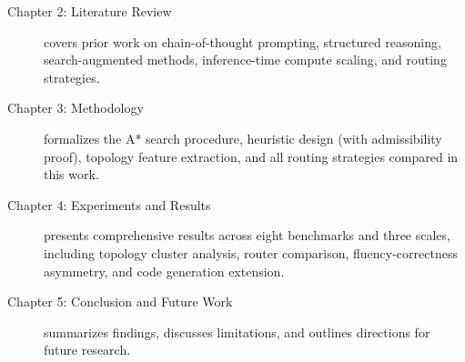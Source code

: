 \begin{description}
\item[Chapter 2: Literature Review] covers prior work on chain-of-thought prompting, structured reasoning, search-augmented methods, inference-time compute scaling, and routing strategies.
\item[Chapter 3: Methodology] formalizes the A* search procedure, heuristic design (with admissibility proof), topology feature extraction, and all routing strategies compared in this work.
\item[Chapter 4: Experiments and Results] presents comprehensive results across eight benchmarks and three scales, including topology cluster analysis, router comparison, fluency-correctness asymmetry, and code generation extension.
\item[Chapter 5: Conclusion and Future Work] summarizes findings, discusses limitations, and outlines directions for future research.
\end{description}
